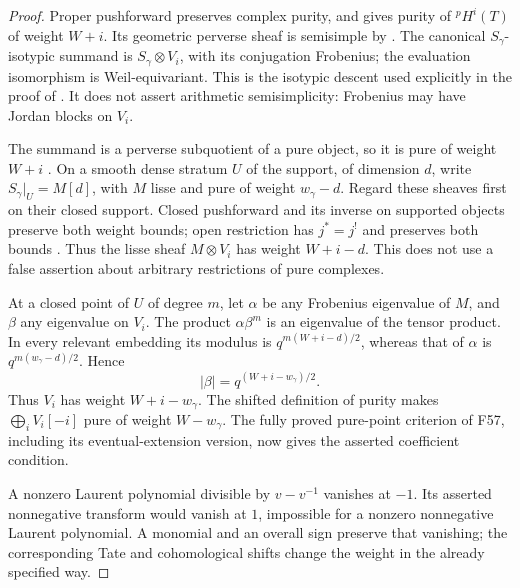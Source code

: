 \documentclass[11pt,a4paper]{article}
\newcommand{\fid}[1]{\textsf{#1}}\newcommand{\gate}[1]{\textsf{#1}}
\theoremstyle{named}\newtheorem{finding}{Finding}[section]
\theoremstyle{definition}\newtheorem{definition}[finding]{Definition}
\theoremstyle{remark}\newtheorem{remark}[finding]{Remark}
\begin{document}
\begin{proof}
Proper pushforward preserves complex purity, and
\cite[Theorem~5.4.1, p.~141; Remark~5.4.9, p.~143]{BBD}
gives purity of \({}^pH^i(T)\) of weight \(W+i\).
Its geometric perverse sheaf is semisimple by
\cite[Theorem~5.3.8, p.~138]{BBD}. The canonical
\(S_\gamma\)-isotypic summand is
\(S_\gamma\otimes V_i\), with its conjugation Frobenius;
the evaluation isomorphism is Weil-equivariant. This is
the isotypic descent used explicitly in the proof of
\cite[Proposition~5.3.9, pp.~139--140]{BBD}.
It does not assert arithmetic semisimplicity: Frobenius
may have Jordan blocks on \(V_i\).

The summand is a perverse subquotient of a pure object,
so it is pure of weight \(W+i\)
\cite[Proposition~5.3.1, pp.~134--135]{BBD}.
On a smooth dense stratum \(U\) of the support, of
dimension \(d\), write
\(S_\gamma|_U=M[d]\), with \(M\) lisse and pure of
weight \(w_\gamma-d\). Regard these sheaves first on
their closed support. Closed pushforward and its inverse
on supported objects preserve both weight bounds; open
restriction has \(j^*=j^!\) and preserves both bounds
\cite[5.1.14, p.~128]{BBD}. Thus the lisse sheaf
\(M\otimes V_i\) has weight \(W+i-d\).
This does not use a false assertion about arbitrary
restrictions of pure complexes.

At a closed point of \(U\) of degree \(m\), let
\(\alpha\) be any Frobenius eigenvalue of \(M\), and
\(\beta\) any eigenvalue on \(V_i\). The product
\(\alpha\beta^m\) is an eigenvalue of the tensor
product. In every relevant embedding its modulus is
\(q^{m(W+i-d)/2}\), whereas that of \(\alpha\) is
\(q^{m(w_\gamma-d)/2}\). Hence
\[
                    |\beta|=q^{(W+i-w_\gamma)/2}.
\]
Thus \(V_i\) has weight \(W+i-w_\gamma\).
The shifted definition of purity makes
\(\bigoplus_iV_i[-i]\) pure of weight \(W-w_\gamma\).
The fully proved pure-point criterion of \fid{F57},
including its eventual-extension version, now gives
the asserted coefficient condition.

A nonzero Laurent polynomial divisible by \(v-v^{-1}\)
vanishes at \(-1\). Its asserted nonnegative transform
would vanish at \(1\), impossible for a nonzero
nonnegative Laurent polynomial. A monomial and an
overall sign preserve that vanishing; the corresponding
Tate and cohomological shifts change the weight in the
already specified way.
\end{proof}
\end{document}
